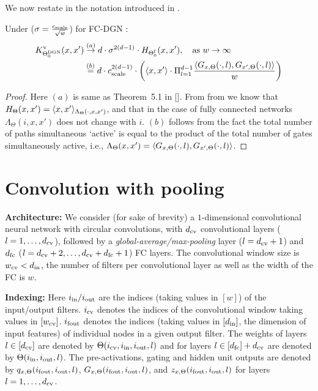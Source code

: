 We now restate  in the notation introduced in .
\begin{theorem} Under   ($\sigma=\frac{c_{\text{scale}}}{\sqrt{w}}$) for FC-DGN : 
\begin{align*}
K^{\text{v}}_{\Theta^{\text{DGN}}_0}(x,x') &\stackrel{(a)}{\rightarrow} d\cdot \sigma^{2(d-1)} \cdot H_{\Theta^{\textrm{f}}_0}(x,x'), \quad\text{as}\,\, w\rightarrow\infty \\
&\stackrel{(b)}{=} d\cdot c_{\text{scale}}^{2(d-1)} \cdot \left(\langle  x,x'\rangle \cdot \Pi_{l=1}^{d-1} \frac{\langle G_{x,\Theta}(\cdot,l), G_{x',\Theta}(\cdot,l)\rangle}w\right)
\end{align*}
\end{theorem} 

\begin{proof}
Here $(a)$ is same as Theorem~5.1 in []. From from  we know that $H_{\Theta}(x,x')=\langle x,x'\rangle_{\Lambda_{\Theta}(\cdot,x,x')}$, and that in the case of fully connected networks $\Lambda_{\Theta}(i,x,x')$ does not change with $i$. $(b)$ follows from the fact the total number of paths simultaneous `active' is equal to the product of the total number of gates simultaneously active, i.e., $\Lambda_{\Theta}(x,x')=\langle G_{x,\Theta}(\cdot,l), G_{x',\Theta}(\cdot,l)\rangle$. 
\end{proof}

\section{Convolution with pooling}
\textbf{Architecture:} We consider (for sake of brevity) a $1$-dimensional convolutional neural network with circular convolutions, with $d_{\text{cv}}$ convolutional layers ($l=1,\ldots,d_{\text{cv}}$), followed by a \emph{global-average/max-pooling} layer ($l=d_{\text{cv}}+1$) and $d_{\text{fc}}$ ($l=d_{\text{cv}}+2,\ldots,d_{\text{cv}}+d_{\text{fc}}+1$) FC  layers. The convolutional window size is $w_{\text{cv}}<d_{\text{in}}$, the number of filters per convolutional layer as well as the width of the FC is $w$. 

\textbf{Indexing:} Here $i_{\text{in}}/i_{\text{out}}$ are the indices (taking values in $[w]$) of the input/output filters. $i_{\text{cv}}$ denotes the indices of the convolutional window taking values in $[w_{\text{cv}}]$. $i_{\text{fout}}$ denotes the indices (taking values in $[d_{\text{in}}]$, the dimension of input features) of individual nodes in a given output filter. The weights of layers $l\in[d_{\text{cv}}]$ are denoted by $\Theta(i_{\text{cv}},i_{\text{in}},i_{\text{out}},l)$ and for layers $l\in[d_{\text{fc}}]+d_{\text{cv}}$ are denoted by $\Theta(i_{\text{in}},i_{\text{out}},l)$. The pre-activations, gating and hidden unit outputs are denoted by $q_{x,\Theta}(i_{\text{fout}},i_{\text{out}},l)$,  $G_{x,\Theta}(i_{\text{fout}},i_{\text{out}},l)$, and $z_{x,\Theta}(i_{\text{fout}},i_{\text{out}},l)$ for layers $l=1,\ldots, d_{\text{cv}}$.


